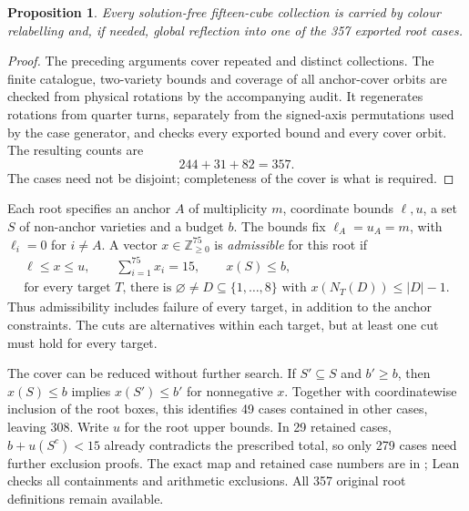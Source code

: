 \documentclass[11pt]{article}
\newtheorem{proposition}[theorem]{Proposition}
\theoremstyle{remark}
\begin{document}
\begin{proposition}\label{prop:cover}
Every solution-free fifteen-cube collection is carried by colour relabelling
and, if needed, global reflection into one of the 357 exported root cases.
\end{proposition}
\begin{proof}
The preceding arguments cover repeated and distinct collections. The finite
catalogue, two-variety bounds and coverage of all anchor-cover orbits are
checked from physical rotations by the accompanying audit. It regenerates
rotations from quarter turns, separately from the signed-axis permutations
used by the case generator, and checks every exported bound and every cover
orbit. The resulting counts are
\[
  244+31+82=357.
\]
The cases need not be disjoint; completeness of the cover is what is required.
\end{proof}

Each root specifies an anchor $A$ of multiplicity $m$, coordinate bounds
$\ell,u$, a set $S$ of non-anchor varieties and a budget $b$.
The bounds fix $\ell_A=u_A=m$, with $\ell_i=0$ for $i\ne A$.
A vector $x\in\mathbb Z_{\ge0}^{75}$ is \emph{admissible} for this root if
\begin{equation}\label{eq:admissible}
\begin{gathered}
 \ell\le x\le u,\qquad \sum_{i=1}^{75}x_i=15,\qquad x(S)\le b,\\
 \text{for every target }T\text{, there is }\varnothing\ne D\subseteq\{1,\ldots,8\}
 \text{ with }x(N_T(D))\le |D|-1.
\end{gathered}
\end{equation}
Thus admissibility includes failure of every target, in addition to the
anchor constraints. The cuts are alternatives within each target, but at
least one cut must hold for every target.

The cover can be reduced without further search. If $S'\subseteq S$ and
$b'\ge b$, then $x(S)\le b$ implies $x(S')\le b'$ for nonnegative $x$.
Together with coordinatewise inclusion of the root boxes, this identifies
49 cases contained in other cases, leaving 308. Write $u$ for the root upper
bounds. In 29 retained cases, $b+u(S^c)<15$ already contradicts the prescribed
total, so only 279 cases
need further exclusion proofs. The exact map and retained case numbers are
in ; Lean checks all containments and
arithmetic exclusions. All 357 original root definitions remain available.
\end{document}
